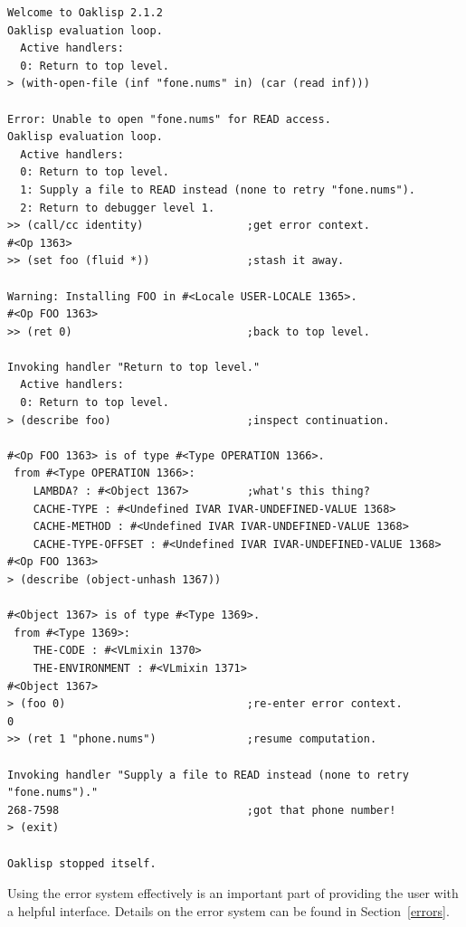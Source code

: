 \begin{verbatim}
Welcome to Oaklisp 2.1.2
Oaklisp evaluation loop.
  Active handlers:
  0: Return to top level.
> (with-open-file (inf "fone.nums" in) (car (read inf)))

Error: Unable to open "fone.nums" for READ access.
Oaklisp evaluation loop.
  Active handlers:
  0: Return to top level.
  1: Supply a file to READ instead (none to retry "fone.nums").
  2: Return to debugger level 1.
>> (call/cc identity)                ;get error context.
#<Op 1363>
>> (set foo (fluid *))               ;stash it away.

Warning: Installing FOO in #<Locale USER-LOCALE 1365>.
#<Op FOO 1363>
>> (ret 0)                           ;back to top level.

Invoking handler "Return to top level."
  Active handlers:
  0: Return to top level.
> (describe foo)                     ;inspect continuation.

#<Op FOO 1363> is of type #<Type OPERATION 1366>.
 from #<Type OPERATION 1366>:
    LAMBDA? : #<Object 1367>         ;what's this thing?
    CACHE-TYPE : #<Undefined IVAR IVAR-UNDEFINED-VALUE 1368>
    CACHE-METHOD : #<Undefined IVAR IVAR-UNDEFINED-VALUE 1368>
    CACHE-TYPE-OFFSET : #<Undefined IVAR IVAR-UNDEFINED-VALUE 1368>
#<Op FOO 1363>
> (describe (object-unhash 1367))

#<Object 1367> is of type #<Type 1369>.
 from #<Type 1369>:
    THE-CODE : #<VLmixin 1370>
    THE-ENVIRONMENT : #<VLmixin 1371>
#<Object 1367>
> (foo 0)                            ;re-enter error context.
0
>> (ret 1 "phone.nums")              ;resume computation.

Invoking handler "Supply a file to READ instead (none to retry "fone.nums")."
268-7598                             ;got that phone number!
> (exit)

Oaklisp stopped itself.
\end{verbatim}

Using the error system effectively is an important part of providing
the user with a helpful interface.  Details on the error system can be
found in Section~\ref{errors}.
